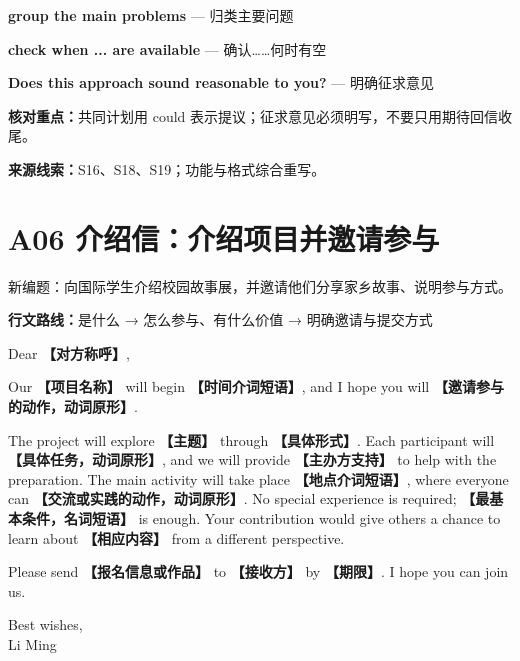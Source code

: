 \documentclass[11pt,a4paper,fontset=macnew]{ctexart}
\newenvironment{writing}{\begingroup\fontsize{10.5}{13.5}\selectfont\setlength{\parskip}{3pt}}{\par\endgroup}
\begin{document}
{\small\textbf{group the main problems} — 归类主要问题}\par
{\small\textbf{check when ... are available} — 确认……何时有空}\par
{\small\textbf{Does this approach sound reasonable to you?} — 明确征求意见}\par
{\small\textbf{核对重点：}共同计划用 could 表示提议；征求意见必须明写，不要只用期待回信收尾。}\par
{\fontsize{8}{10}\selectfont\textbf{来源线索：}S16、S18、S19；功能与格式综合重写。}\par
\clearpage\section*{A06  介绍信：介绍项目并邀请参与}
{\small 新编题：向国际学生介绍校园故事展，并邀请他们分享家乡故事、说明参与方式。}\par
{\small\textbf{行文路线：}是什么 → 怎么参与、有什么价值 → 明确邀请与提交方式}\par
\par\vspace{4pt}{\bfseries 可替换模板}\par\nopagebreak
\begin{writing}
\noindent Dear {\bfseries 【对方称呼】},\par
Our {\bfseries 【项目名称】} will begin {\bfseries 【时间介词短语】}, and I hope you will {\bfseries 【邀请参与的动作，动词原形】}.

The project will explore {\bfseries 【主题】} through {\bfseries 【具体形式】}. Each participant will {\bfseries 【具体任务，动词原形】}, and we will provide {\bfseries 【主办方支持】} to help with the preparation. The main activity will take place {\bfseries 【地点介词短语】}, where everyone can {\bfseries 【交流或实践的动作，动词原形】}. No special experience is required; {\bfseries 【最基本条件，名词短语】} is enough. Your contribution would give others a chance to learn about {\bfseries 【相应内容】} from a different perspective.

Please send {\bfseries 【报名信息或作品】} to {\bfseries 【接收方】} by {\bfseries 【期限】}. I hope you can join us.

\noindent Best wishes,\\Li Ming\par
\end{writing}
\par\vspace{4pt}{\bfseries 完整套用示例}\par\nopagebreak
\end{document}

